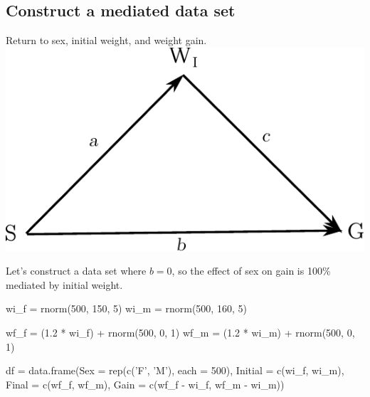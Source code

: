 \documentclass[xcolor=dvipsnames]{beamer}
\begin{document}
\subsection{Construct a mediated data set}
\begin{frame}{}
	Return to sex, initial weight, and weight gain.
	\includegraphics{arrow_diag.pdf}

	Let's construct a data set where $b = 0$, so the effect of sex on gain is
	100\% mediated by initial weight.
\end{frame}

\begin{frame}{}
	\begin{lstlistings}
		wi\_f = rnorm(500, 150, 5)
		wi\_m = rnorm(500, 160, 5)

		wf\_f = (1.2 * wi\_f) + rnorm(500, 0, 1)
		wf\_m = (1.2 * wi\_m) + rnorm(500, 0, 1)

		df = data.frame(Sex = rep(c('F', 'M'), each = 500),
						Initial = c(wi\_f, wi\_m),
						Final = c(wf\_f, wf\_m),
						Gain = c(wf\_f - wi\_f, wf\_m - wi\_m))
	\end{lstlistings}
\end{frame} 
\end{document}
